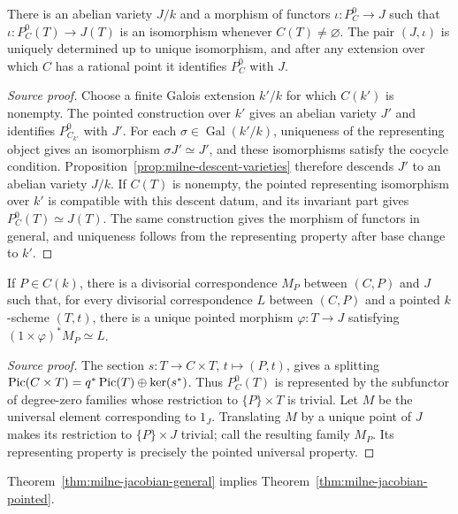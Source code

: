 \begin{theorem}\label{thm:milne-jacobian-general}
There is an abelian variety $J/k$ and a morphism of functors $\iota:P_C^0\to J$ such that $\iota:P_C^0(T)\to J(T)$ is an isomorphism whenever $C(T)\ne\varnothing$. The pair $(J,\iota)$ is uniquely determined up to unique isomorphism, and after any extension over which $C$ has a rational point it identifies $P_C^0$ with $J$.
\end{theorem}
\begin{proof}[Source proof]
Choose a finite Galois extension $k'/k$ for which $C(k')$ is nonempty.  The
pointed construction over $k'$ gives an abelian variety $J'$ and identifies
$P^0_{C_{k'}}$ with $J'$.  For each $\sigma\in\operatorname{Gal}(k'/k)$,
uniqueness of the representing object gives an isomorphism
$\sigma J'\simeq J'$, and these isomorphisms satisfy the cocycle condition.
Proposition~\ref{prop:milne-descent-varieties} therefore descends $J'$ to an
abelian variety $J/k$.  If $C(T)$ is nonempty, the pointed representing
isomorphism over $k'$ is compatible with this descent datum, and its invariant
part gives $P^0_C(T)\simeq J(T)$.  The same construction gives the morphism of
functors in general, and uniqueness follows from the representing property
after base change to $k'$.
\end{proof}
\begin{theorem}\label{thm:milne-jacobian-pointed}
If $P\in C(k)$, there is a divisorial correspondence $M_P$ between $(C,P)$ and $J$ such that, for every divisorial correspondence $L$ between $(C,P)$ and a pointed $k$-scheme $(T,t)$, there is a unique pointed morphism $\varphi:T\to J$ satisfying $(1\times\varphi)^*M_P\simeq L$.
\end{theorem}
\begin{proof}[Source proof]
The section $s:T\to C\times T$, $t\mapsto(P,t)$, gives a splitting
$\operatorname{Pic}(C\times T)=q^*\operatorname{Pic}(T)\oplus\ker(s^*)$.  Thus $P_C^0(T)$ is represented
by the subfunctor of degree-zero families whose restriction to
$\{P\}\times T$ is trivial.  Let $M$ be the universal element corresponding to
$1_J$.  Translating $M$ by a unique point of $J$ makes its restriction to
$\{P\}\times J$ trivial; call the resulting family $M_P$.  Its representing
property is precisely the pointed universal property.
\end{proof}
\begin{lemma}\label{lem:milne-jacobian-pointed-from-representability}
Theorem~\ref{thm:milne-jacobian-general} implies Theorem~\ref{thm:milne-jacobian-pointed}.
\end{lemma}

